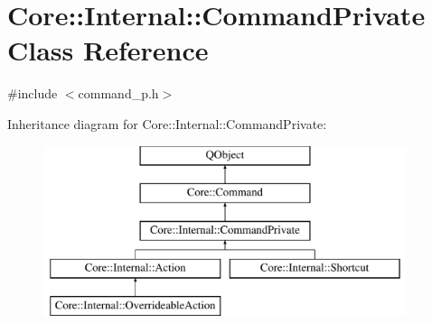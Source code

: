 \hypertarget{class_core_1_1_internal_1_1_command_private}{\section{Core\-:\-:Internal\-:\-:Command\-Private Class Reference}
\label{class_core_1_1_internal_1_1_command_private}
}


{\ttfamily \#include $<$command\-\_\-p.\-h$>$}

Inheritance diagram for Core\-:\-:Internal\-:\-:Command\-Private\-:\begin{figure}[H]
\begin{center}
\leavevmode
\includegraphics[height=5.000000cm]{class_core_1_1_internal_1_1_command_private}
\end{center}
\end{figure}
